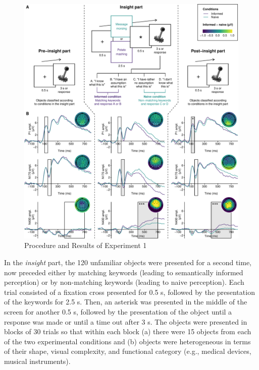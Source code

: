 \documentclass[
  english,
  doc,12pt,twoside,floatsintext]{apa7}
\begin{document}
\begin{figure}

{\centering \includegraphics[width=1\linewidth]{master_thesis_files/figure-latex/exp1-plot-1} 

}

\caption{Procedure and Results of Experiment 1\smallskip}\label{fig:exp1-plot}
\end{figure}



In the \emph{insight} part, the 120 unfamiliar objects were presented for a second time, now preceded either by matching keywords (leading to semantically informed perception) or by non-matching keywords (leading to naive perception). Each trial consisted of a fixation cross presented for 0.5 s, followed by the presentation of the keywords for 2.5 s. Then, an asterisk was presented in the middle of the screen for another 0.5 s, followed by the presentation of the object until a response was made or until a time out after 3 s. The objects were presented in blocks of 30 trials so that within each block (a) there were 15 objects from each of the two experimental conditions and (b) objects were heterogeneous in terms of their shape, visual complexity, and functional category (e.g., medical devices, musical instruments).
\end{document}
